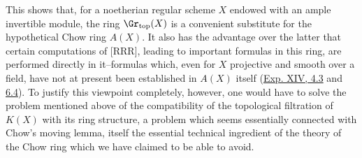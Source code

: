 This shows that, for a noetherian regular scheme $X$ endowed with an ample invertible module, the ring $\Gr_{\mathrm{top}}(X)$ is a convenient substitute for the hypothetical Chow ring $A(X)$. It also has the advantage over the latter that certain computations of [RRR], leading to important formulas in this ring, are performed directly in it--formulas which, even for $X$ projective and smooth over a field, have not at present been established in $A(X)$ itself (\hyperlink{sga6.e14.para.4-3}{Exp. XIV, 4.3} and \hyperlink{sga6.e14.para.6-4}{6.4}). To justify this viewpoint completely, however, one would have to solve the problem mentioned above of the compatibility of the topological filtration of $K(X)$ with its ring structure, a problem which seems essentially connected with Chow's moving lemma, itself the essential technical ingredient of the theory of the Chow ring which we have claimed to be able to avoid.

